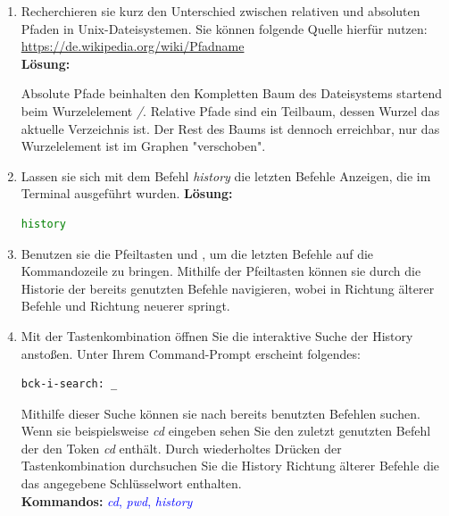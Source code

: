 \documentclass[paper=a4,fontsize=11pt]{scrartcl}%
\numberwithin{equation}{section}
\newenvironment{solution}
	{
		\color{blue}
		\textbf{Lösung:}
	}{}
\begin{document}
\begin{enumerate}
\begin{enumerate}[label=(\alph*)]
		\begin{solution}
		\begin{lstlisting}[style=Bash, language=Bash]
cd 
#oder
cd ~
		\end{lstlisting}
		\end{solution}
		\item Recherchieren sie kurz den Unterschied zwischen relativen und absoluten Pfaden in Unix-Dateisystemen. Sie können folgende Quelle hierfür nutzen: \url{https://de.wikipedia.org/wiki/Pfadname}\\
		\begin{solution}
		Absolute Pfade beinhalten den Kompletten Baum des Dateisystems startend beim Wurzelelement \emph{/}. Relative Pfade sind ein Teilbaum, dessen Wurzel das aktuelle Verzeichnis ist. Der Rest des Baums ist dennoch erreichbar, nur das Wurzelelement ist im Graphen "verschoben".
		\end{solution}
		\item Lassen sie sich mit dem Befehl \emph{history} die letzten Befehle Anzeigen, die im Terminal ausgeführt wurden. 
		\begin{solution}
		\begin{lstlisting}[style=Bash, language=Bash]
history
		\end{lstlisting}
		\end{solution}
		\item Benutzen sie die Pfeiltasten \keys{\arrowkeyup} und \keys{\arrowkeydown}, um die letzten Befehle auf die Kommandozeile zu bringen. Mithilfe der Pfeiltasten können sie durch die Historie der bereits genutzten Befehle navigieren, wobei \keys{\arrowkeyup} in Richtung älterer Befehle und \keys{\arrowkeydown} Richtung neuerer springt.
		\item Mit der Tastenkombination  öffnen Sie die interaktive Suche der History anstoßen. Unter Ihrem Command-Prompt erscheint folgendes:\\
		\begin{lstlisting}[style=Bash, language=Bash]
bck-i-search: _
		\end{lstlisting}
		Mithilfe dieser Suche können sie nach bereits benutzten Befehlen suchen. Wenn sie beispielsweise \emph{cd} eingeben sehen Sie den zuletzt genutzten Befehl der den Token \emph{cd} enthält. Durch wiederholtes Drücken der Tastenkombination  durchsuchen Sie die History Richtung älterer Befehle die das angegebene Schlüsselwort enthalten.\\
		\textbf{Kommandos:} \textcolor{blue}{\emph{cd}, \emph{pwd}, \emph{history}}

\end{enumerate}
\end{enumerate}
\end{document}
